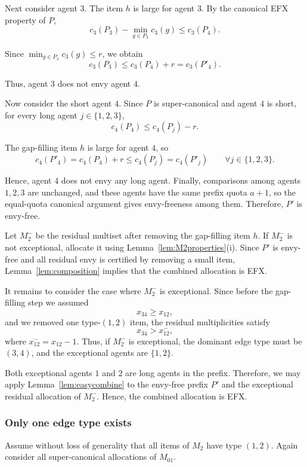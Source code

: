 \documentclass{article}
\theoremstyle{definition}
\begin{document}
Next consider agent $3$.  The item $h$ is large for agent $3$.  By the
canonical EFX property of $P$,
\[
    c_3(P_3)-\min_{g\in P_3}c_3(g)\le c_3(P_4).
\]

Since $\min_{g\in P_3}c_3(g)\le r$, we obtain
\[
    c_3(P_3)\le c_3(P_4)+r=c_3(P'_4).
\]

Thus, agent $3$ does not envy agent $4$.

Now consider the short agent $4$.  Since $P$ is super-canonical and agent $4$
is short, for every long agent $j\in\{1,2,3\}$,
\[
    c_4(P_4)\le c_4(P_j)-r.
\]

The gap-filling item $h$ is large for agent $4$, so
\[
    c_4(P'_4)=c_4(P_4)+r\le c_4(P_j)=c_4(P'_j)
    \qquad\forall j\in\{1,2,3\}.
\]

Hence, agent $4$ does not envy any long agent.  Finally, comparisons among
agents $1,2,3$ are unchanged, and these agents have the same prefix quota
$a+1$, so the equal-quota canonical argument gives envy-freeness among them.
Therefore, $P'$ is envy-free.

Let $M_2^-$ be the residual multiset after removing the gap-filling item
$h$.  If $M_2^-$ is not exceptional, allocate it using
Lemma~\ref{lem:M2properties}(i).  Since $P'$ is envy-free and all residual
envy is certified by removing a small item, Lemma~\ref{lem:composition}
implies that the combined allocation is EFX.

It remains to consider the case where $M_2^-$ is exceptional.  Since before
the gap-filling step we assumed
\[
    x_{34}\ge x_{12},
\]
and we removed one type-$(1,2)$ item, the residual multiplicities satisfy
\[
    x_{34}>x_{12}^-,
\]
where $x_{12}^-=x_{12}-1$.  Thus, if $M_2^-$ is exceptional, the dominant
edge type must be $(3,4)$, and the exceptional agents are $\{1,2\}$.

Both exceptional agents $1$ and $2$ are long agents in the prefix.  Therefore,
we may apply Lemma~\ref{lem:easycombine} to the envy-free prefix $P'$ and the
exceptional residual allocation of $M_2^-$.  Hence, the combined allocation is
EFX.



\subsubsection{Only one edge type exists}

Assume without loss of generality that all items of $M_2$ have type $(1,2)$. Again consider all super-canonical allocations of $M_{01}$.
\end{document}
